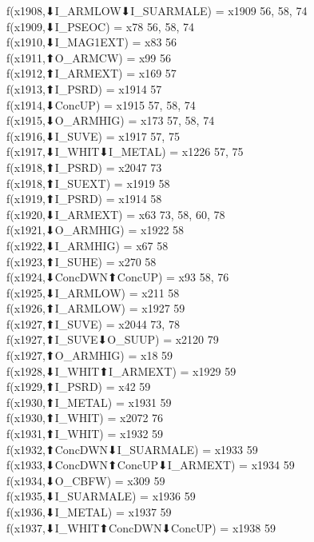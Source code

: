 f(x1908,⬇I_ARMLOW⬇I_SUARMALE) = x1909 {56, 58, 74} \\
f(x1909,⬇I_PSEOC) = x78 {56, 58, 74} \\
f(x1910,⬇I_MAG1EXT) = x83 {56} \\
f(x1911,⬆O_ARMCW) = x99 {56} \\
f(x1912,⬆I_ARMEXT) = x169 {57} \\
f(x1913,⬆I_PSRD) = x1914 {57} \\
f(x1914,⬇ConcUP) = x1915 {57, 58, 74} \\
f(x1915,⬇O_ARMHIG) = x173 {57, 58, 74} \\
f(x1916,⬇I_SUVE) = x1917 {57, 75} \\
f(x1917,⬇I_WHIT⬇I_METAL) = x1226 {57, 75} \\
f(x1918,⬆I_PSRD) = x2047 {73} \\
f(x1918,⬆I_SUEXT) = x1919 {58} \\
f(x1919,⬆I_PSRD) = x1914 {58} \\
f(x1920,⬇I_ARMEXT) = x63 {73, 58, 60, 78} \\
f(x1921,⬇O_ARMHIG) = x1922 {58} \\
f(x1922,⬇I_ARMHIG) = x67 {58} \\
f(x1923,⬆I_SUHE) = x270 {58} \\
f(x1924,⬇ConcDWN⬆ConcUP) = x93 {58, 76} \\
f(x1925,⬇I_ARMLOW) = x211 {58} \\
f(x1926,⬆I_ARMLOW) = x1927 {59} \\
f(x1927,⬆I_SUVE) = x2044 {73, 78} \\
f(x1927,⬆I_SUVE⬇O_SUUP) = x2120 {79} \\
f(x1927,⬆O_ARMHIG) = x18 {59} \\
f(x1928,⬇I_WHIT⬆I_ARMEXT) = x1929 {59} \\
f(x1929,⬆I_PSRD) = x42 {59} \\
f(x1930,⬆I_METAL) = x1931 {59} \\
f(x1930,⬆I_WHIT) = x2072 {76} \\
f(x1931,⬆I_WHIT) = x1932 {59} \\
f(x1932,⬆ConcDWN⬇I_SUARMALE) = x1933 {59} \\
f(x1933,⬇ConcDWN⬆ConcUP⬇I_ARMEXT) = x1934 {59} \\
f(x1934,⬇O_CBFW) = x309 {59} \\
f(x1935,⬇I_SUARMALE) = x1936 {59} \\
f(x1936,⬇I_METAL) = x1937 {59} \\
f(x1937,⬇I_WHIT⬆ConcDWN⬇ConcUP) = x1938 {59} \\
